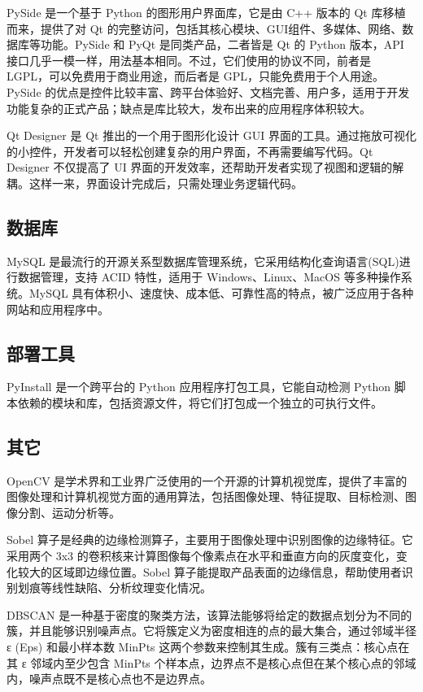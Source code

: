 \documentclass[
  ]{njuthesis}
\begin{document}
PySide 是一个基于 Python 的图形用户界面库，它是由 C++ 版本的 Qt 库移植而来，提供了对 Qt 的完整访问，包括其核心模块、GUI组件、多媒体、网络、数据库等功能。PySide 和 PyQt 是同类产品，二者皆是 Qt 的 Python 版本，API 接口几乎一模一样，用法基本相同。不过，它们使用的协议不同，前者是 LGPL，可以免费用于商业用途，而后者是 GPL，只能免费用于个人用途。PySide 的优点是控件比较丰富、跨平台体验好、文档完善、用户多，适用于开发功能复杂的正式产品；缺点是库比较大，发布出来的应用程序体积较大。

Qt Designer 是 Qt 推出的一个用于图形化设计 GUI 界面的工具。通过拖放可视化的小控件，开发者可以轻松创建复杂的用户界面，不再需要编写代码。Qt Designer 不仅提高了 UI 界面的开发效率，还帮助开发者实现了视图和逻辑的解耦。这样一来，界面设计完成后，只需处理业务逻辑代码。

\subsection{数据库}

MySQL 是最流行的开源关系型数据库管理系统，它采用结构化查询语言(SQL)进行数据管理，支持 ACID 特性，适用于 Windows、Linux、MacOS 等多种操作系统。MySQL 具有体积小、速度快、成本低、可靠性高的特点，被广泛应用于各种网站和应用程序中。

\subsection{部署工具}

PyInstall 是一个跨平台的 Python 应用程序打包工具，它能自动检测 Python 脚本依赖的模块和库，包括资源文件，将它们打包成一个独立的可执行文件。

\subsection{其它}

OpenCV 是学术界和工业界广泛使用的一个开源的计算机视觉库，提供了丰富的图像处理和计算机视觉方面的通用算法，包括图像处理、特征提取、目标检测、图像分割、运动分析等。

Sobel 算子是经典的边缘检测算子，主要用于图像处理中识别图像的边缘特征。它采用两个 3x3 的卷积核来计算图像每个像素点在水平和垂直方向的灰度变化，变化较大的区域即边缘位置。Sobel 算子能提取产品表面的边缘信息，帮助使用者识别划痕等线性缺陷、分析纹理变化情况。

DBSCAN 是一种基于密度的聚类方法，该算法能够将给定的数据点划分为不同的簇，并且能够识别噪声点。它将簇定义为密度相连的点的最大集合，通过邻域半径 ε (Eps) 和最小样本数 MinPts 这两个参数来控制其生成。簇有三类点：核心点在其 ε 邻域内至少包含 MinPts 个样本点，边界点不是核心点但在某个核心点的邻域内，噪声点既不是核心点也不是边界点。
\end{document}
